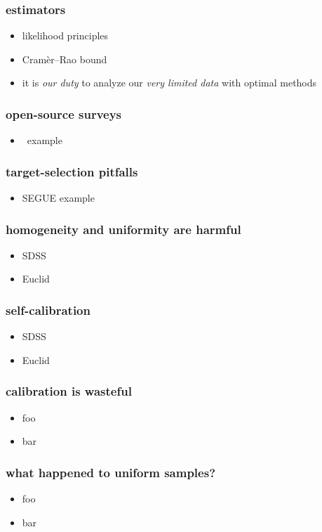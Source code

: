 \documentclass[pdftex]{beamer}
\begin{document}
\begin{frame}
  \frametitle{estimators}
  \begin{itemize}
  \item likelihood principles
  \item Cram\`er--Rao bound
  \item it is \emph{our duty} to analyze our \emph{very limited data} with optimal methods
  \end{itemize}
\end{frame}

\begin{frame}
  \frametitle{open-source surveys}
  \begin{itemize}
  \item \hipparcos\ example
  \end{itemize}
\end{frame}

\begin{frame}
  \frametitle{target-selection pitfalls}
  \begin{itemize}
  \item SEGUE example
  \end{itemize}
\end{frame}

\begin{frame}
  \frametitle{homogeneity and uniformity are harmful}
  \begin{itemize}
  \item SDSS
  \item Euclid
  \end{itemize}
\end{frame}

\begin{frame}
  \frametitle{self-calibration}
  \begin{itemize}
  \item SDSS
  \item Euclid
  \end{itemize}
\end{frame}

\begin{frame}
  \frametitle{calibration is wasteful}
  \begin{itemize}
  \item foo
  \item bar
  \end{itemize}
\end{frame}

\begin{frame}
  \frametitle{what happened to uniform samples?}
  \begin{itemize}
  \item foo
  \item bar
  \end{itemize}
\end{frame}
\end{document}
